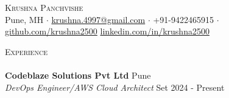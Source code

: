 \documentclass[a4paper]{article}
\newcommand{\lineunder} {
    \vspace*{-8pt} \\
    \hspace*{-18pt} \hrulefill \\
}
\newcommand{\header} [1] {
    {\hspace*{-18pt}\vspace*{6pt} \textsc{#1}}
    \vspace*{-6pt} \lineunder
}
\begin{document}
\vspace*{-40pt}



\vspace*{-10pt}
\begin{center}
    {\Huge \scshape {Krushna Panchvishe}}\\
    Pune, MH $\cdot$ \href{mailto:krushna.4997@gmail.com}{krushna.4997@gmail.com} $\cdot$ +91-9422465915 $\cdot$ \href{https://github.com/krushna2500}{github.com/krushna2500} \href{https://www.linkedin.com/in/krushna-panchvishe-ba0b6513a/}{linkedin.com/in/krushna2500}\\
\end{center}
\header{Experience}

\vspace{1mm}
\textbf{Codeblaze Solutions Pvt Ltd} \hfill Pune\\
\textit{DevOps Engineer/AWS Cloud Architect} \hfill Set 2024 - Present\\
\vspace{-1mm}
\end{document}
